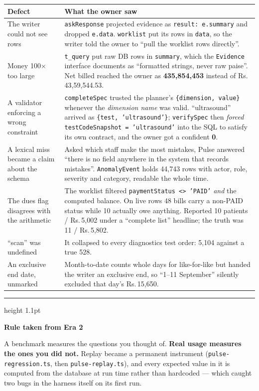 \documentclass[11pt,a4paper]{report}
\newcommand{\rs}[1]{Rs.\,#1}
\newcommand{\file}[1]{\texttt{\small #1}}
\newcommand{\code}[1]{\texttt{\small #1}}
\newenvironment{keybox}[1]
 {\par\medskip\begin{center}\begin{minipage}{0.94\textwidth}%
  {\color{navy}\hrule height 1.1pt}\vspace{5pt}\par
  \textbf{\color{navy}#1}\par\vspace{3pt}\small}
 {\par\vspace{5pt}{\color{mist}\hrule height 0.8pt}\end{minipage}\end{center}\medskip}
\begin{document}
\begin{center}
\small
\begin{tabular}{@{}p{5.2cm}p{9.6cm}@{}}
\toprule
\textbf{Defect} & \textbf{What the owner saw}\\
\midrule
The writer could not see rows & \code{askResponse} projected evidence as \code{result: e.summary}
 and dropped \code{e.data}. \code{worklist} put its rows in \code{data}, so the writer told the
 owner to ``pull the worklist rows directly''.\\
Money 100$\times$ too large & \code{t\_query} put raw DB rows in \code{summary}, which the
 \code{Evidence} interface documents as ``formatted strings, never raw paise''. Net billed reached
 the owner as \textbf{435{,}854{,}453} instead of \rs{43{,}59{,}544.53}.\\
A validator enforcing a wrong constraint & \code{completeSpec} trusted the planner's
 \code{\{dimension, value\}} whenever the \emph{dimension name} was valid. ``ultrasound'' arrived
 as \code{\{test, 'ultrasound'\}}; \code{verifySpec} then \emph{forced}
 \code{testCodeSnapshot = 'ultrasound'} into the SQL to satisfy its own contract, and the owner got
 a confident \textbf{0}.\\
A lexical miss became a claim about the schema & Asked which staff make the most mistakes, Pulse
 answered ``there is no field anywhere in the system that records mistakes''. \code{AnomalyEvent}
 holds 44{,}743 rows with actor, role, severity and category, readable the whole time.\\
The dues flag disagrees with the arithmetic & The worklist filtered \code{paymentStatus <> 'PAID'}
 \emph{and} the computed balance. On live rows 48 bills carry a non-PAID status while 10 actually
 owe anything. Reported 10 patients / \rs{5{,}002} under a ``complete list'' headline; the truth
 was 11 / \rs{5{,}802}.\\
``scan'' was undefined & It collapsed to every diagnostics test order: 5{,}104 against a true 528.\\
An exclusive end date, unmarked & Month-to-date counts whole days for like-for-like but handed the
 writer an exclusive end, so ``1--11 September'' silently excluded that day's \rs{15{,}650}.\\
\bottomrule
\end{tabular}
\end{center}

\begin{keybox}{Rule taken from Era 2}
A benchmark measures the questions you thought of. \textbf{Real usage measures the ones you did
not.} Replay became a permanent instrument (\file{pulse-regression.ts}, then
\file{pulse-replay.ts}), and every expected value in it is computed from the database at run time
rather than hardcoded --- which caught two bugs in the harness itself on its first run.
\end{keybox}
\end{document}
